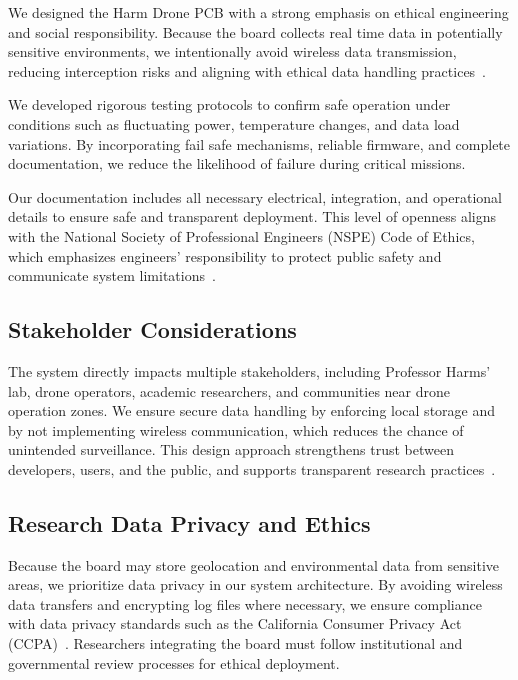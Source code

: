 \documentclass[12pt]{article}
\begin{document}
\par We designed the Harm Drone PCB with a strong emphasis on ethical engineering and social responsibility. Because the board collects real time data in potentially sensitive environments, we intentionally avoid wireless data transmission, reducing interception risks and aligning with ethical data handling practices~\cite{parrot2023,microchip2023}.

\par We developed rigorous testing protocols to confirm safe operation under conditions such as fluctuating power, temperature changes, and data load variations. By incorporating fail safe mechanisms, reliable firmware, and complete documentation, we reduce the likelihood of failure during critical missions.

\par Our documentation includes all necessary electrical, integration, and operational details to ensure safe and transparent deployment. This level of openness aligns with the National Society of Professional Engineers (NSPE) Code of Ethics, which emphasizes engineers' responsibility to protect public safety and communicate system limitations~\cite{nspe}.

\subsection{Stakeholder Considerations}

\par The system directly impacts multiple stakeholders, including Professor Harms' lab, drone operators, academic researchers, and communities near drone operation zones. We ensure secure data handling by enforcing local storage and by not implementing wireless communication, which reduces the chance of unintended surveillance. This design approach strengthens trust between developers, users, and the public, and supports transparent research practices~\cite{parrot2023}.

\subsection{Research Data Privacy and Ethics}

\par Because the board may store geolocation and environmental data from sensitive areas, we prioritize data privacy in our system architecture. By avoiding wireless data transfers and encrypting log files where necessary, we ensure compliance with data privacy standards such as the California Consumer Privacy Act (CCPA)~\cite{microchip2023}. Researchers integrating the board must follow institutional and governmental review processes for ethical deployment.
\end{document}
